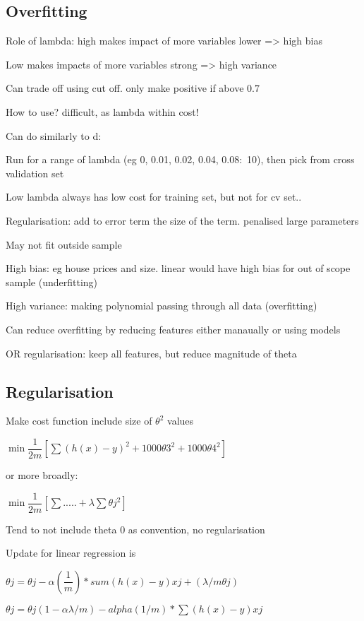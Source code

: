 
\subsection{Overfitting}

Role of lambda: high makes impact of more variables lower => high bias

Low makes impacts of more variables strong => high variance

Can trade off using cut off. only make positive if above \(0.7\)

How to use? difficult, as lambda within cost!

Can do similarly to d:

Run for a range of lambda (eg 0, 0.01, 0.02, 0.04, 0.08:~10), then pick from cross validation set

Low lambda always has low cost for training set, but not for cv set..

Regularisation: add to error term the size of the term. penalised large parameters

May not fit outside sample

High bias: eg house prices and size. linear would have high bias for out of scope sample (underfitting)

High variance: making polynomial passing through all data (overfitting)

Can reduce overfitting by reducing features either manaually or using models

OR regularisation: keep all features, but reduce magnitude of theta

\subsection{Regularisation}

Make cost function include size of \(\theta^2\) values

\(\min \dfrac{1}{2m} [\sum (h(x)-y)^2 + 1000 \theta 3 ^2 + 1000 \theta 4 ^2]\)

or more broadly:

\(\min \dfrac{1}{2m}[\sum ..... + \lambda \sum \theta j^2]\)

Tend to not include theta 0 as convention, no regularisation

Update for linear regression is

\(\theta j = \theta j -\alpha{(\dfrac{1}{m})* sum(h(x)-y)xj + (\lambda/m \theta j)}\)

\(\theta j = \theta j (1- \alpha \lambda / m) -alpha {(1/m)*\sum(h(x)-y)xj}\)

